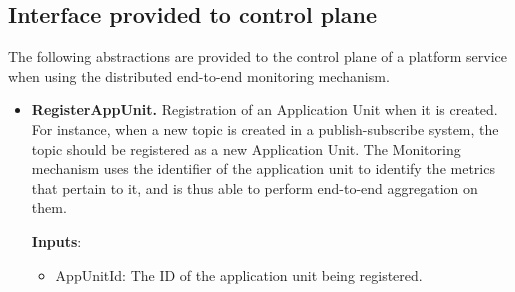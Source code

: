 \subsection{Interface provided to control plane}
The following abstractions are provided to the control plane of a platform service when using the distributed end-to-end monitoring mechanism.
\begin{itemize}
\item \textbf{RegisterAppUnit.} Registration of an Application Unit when it is created. For instance, when a new topic is created in a publish-subscribe system, the topic should be registered as a new Application Unit. The Monitoring mechanism uses the identifier of the application unit to identify the metrics that pertain to it, and is thus able to perform end-to-end aggregation on them. 
\par \noindent \textbf{Inputs}:
\begin{itemize}
\item AppUnitId: The ID of the application unit being registered.
\end{itemize}


\end{itemize}
